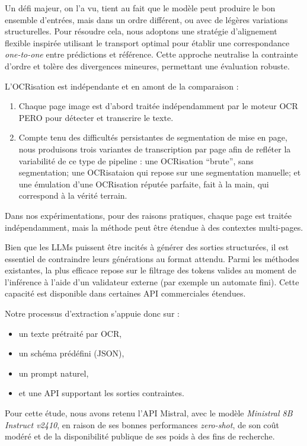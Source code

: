 Un défi majeur, on l'a vu, tient au fait que le modèle peut produire le bon ensemble d’entrées, mais dans un ordre différent, ou avec de légères variations structurelles. Pour résoudre cela, nous adoptons une stratégie d’alignement flexible inspirée utilisant le transport optimal pour établir une correspondance \emph{one-to-one} entre prédictions et référence. Cette approche neutralise la contrainte d’ordre et tolère des divergences mineures, permettant une évaluation robuste.

L'OCRisation est indépendante et en amont de la comparaison :

\begin{enumerate}
\item Chaque page image est d’abord traitée indépendamment par le moteur OCR PERO pour détecter et transcrire le texte.
\item Compte tenu des difficultés persistantes de segmentation de mise en page, nous produisons trois variantes de transcription par page afin de refléter la variabilité de ce type de pipeline : une OCRisation \enquote{brute}, sans segmentation; une OCRisataion qui repose sur une segmentation manuelle; et une émulation d'une OCRisation réputée parfaite, fait à la main, qui correspond à la vérité terrain.

\end{enumerate}
Dans nos expérimentations, pour des raisons pratiques, chaque page est traitée indépendamment, mais la méthode peut être étendue à des contextes multi-pages.

Bien que les LLMs puissent être incités à générer des sorties structurées, il est essentiel de contraindre leurs générations au format attendu. Parmi les méthodes existantes, la plus efficace repose sur le filtrage des tokens valides au moment de l’inférence à l’aide d’un validateur externe (par exemple un automate fini). Cette capacité est disponible dans certaines API commerciales étendues.

Notre processus d’extraction s’appuie donc sur :

\begin{itemize}
\item un texte prétraité par OCR,
\item un schéma prédéfini (JSON),
\item un prompt naturel,
\item et une API supportant les sorties contraintes.

\end{itemize}
Pour cette étude, nous avons retenu l’API Mistral, avec le modèle \emph{Ministral 8B Instruct v2410}, en raison de ses bonnes performances \emph{zero-shot}, de son coût modéré et de la disponibilité publique de ses poids à des fins de recherche.

